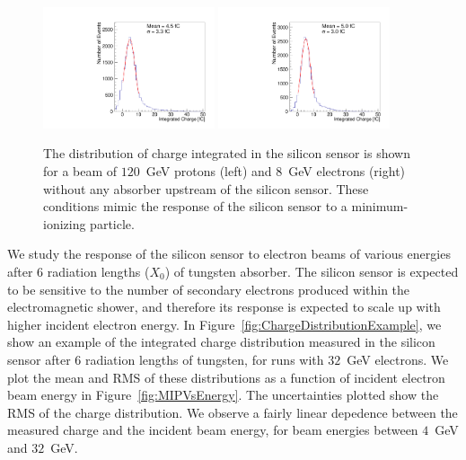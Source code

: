 \documentclass[12pt]{article}
\begin{document}
{\begin{figure}[htbp] 
\centering
\includegraphics[width=0.45\textwidth]{plots/Proton_charge.pdf} 
\includegraphics[width=0.45\textwidth]{plots/Electron_0X0_charge.pdf} 
\caption{The distribution of charge integrated in the silicon sensor is shown
for a beam of $120$~GeV protons (left) and $8$~GeV electrons (right) without
any absorber upstream of the silicon sensor. These conditions mimic the response
of the silicon sensor to a minimum-ionizing particle. 
} 
\label{fig:MIP} 
\end{figure} 

We study the response of the silicon sensor to electron beams of various
energies after 6 radiation lengths ($X_0$) of tungsten absorber. The silicon
sensor is expected to be sensitive to the number of secondary electrons produced
within the electromagnetic shower, and therefore its response is expected to
scale up with higher incident electron energy. In
Figure~\ref{fig:ChargeDistributionExample}, we show an example of the integrated
charge distribution measured in the silicon sensor after 6 radiation lengths of
tungsten, for runs with $32$~GeV electrons. We plot the mean and RMS of
these distributions as a function of incident electron beam energy in
Figure~\ref{fig:MIPVsEnergy}. The uncertainties plotted show the RMS of the
charge distribution. We observe a fairly linear depedence between the measured
charge and the incident beam energy, for beam energies between $4$~GeV and
$32$~GeV. 

}
\end{document}
